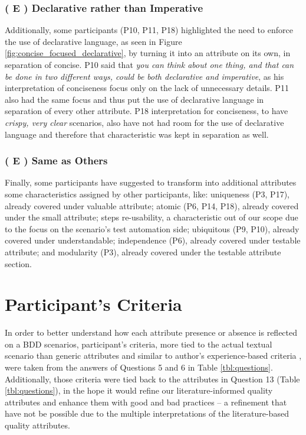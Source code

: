 \subsubsection{\textbf{( E ) Declarative rather than Imperative}}
Additionally, some participants (P10, P11, P18) highlighted the need to enforce the use of declarative language, as seen in Figure \ref{fig:concise_focused_declarative}, by turning it into an attribute on its own, in separation of concise. P10 said that \textit{you can think about one thing, and that can be done in two different ways, could be both declarative and imperative}, as his interpretation of conciseness focus only on the lack of unnecessary details. P11 also had the same focus and thus put the use of declarative language in separation of every other attribute. P18 interpretation for conciseness, to have \textit{crispy, very clear} scenarios, also have not had room for the use of declarative language and therefore that characteristic was kept in separation as well.

\subsubsection{\textbf{( E ) Same as Others}}
Finally, some participants have suggested to transform into additional attributes some characteristics assigned by other participants, like: uniqueness (P3, P17), already covered under valuable attribute; atomic (P6, P14, P18), already covered under the small attribute; steps re-usability, a characteristic out of our scope due to the focus on the scenario's test automation side; ubiquitous (P9, P10), already covered under understandable; independence (P6), already covered under testable attribute; and modularity (P3), already covered under the testable attribute section.

\section{\label{chap:chap4_criteria}Participant's Criteria}

In order to better understand how each attribute presence or absence is reflected on a BDD scenarios, participant's criteria, more tied to the actual textual scenario than generic attributes and similar to author's experience-based criteria \cite{Smart_2014}\cite{Wynne_and_Hellesoy_2012}, were taken from the answers of Questions 5 and 6 in Table \ref{tbl:questions}. Additionally, those criteria were tied back to the attributes in Question 13 (Table \ref{tbl:questions}), in the hope it would refine our literature-informed quality attributes and enhance them with good and bad practices -- a refinement that have not be possible due to the multiple interpretations of the literature-based quality attributes.

